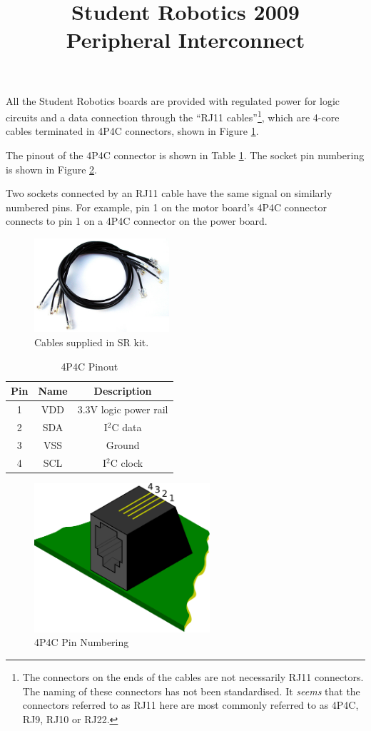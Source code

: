 \documentclass[a4paper,twocolumn]{article}
\title{Student Robotics 2009\\ Peripheral Interconnect}
\newcommand{\itwoc}{I$^2$C }
\begin{document}
\maketitle

All the Student Robotics boards are provided with regulated power for logic circuits and a data connection through the ``RJ11 cables''\footnote{The connectors on the ends of the cables are not necessarily RJ11 connectors.  The naming of these connectors has not been standardised.  It \emph{seems} that the connectors referred to as RJ11 here are most commonly referred to as 4P4C, RJ9, RJ10 or RJ22.}, which are 4-core cables terminated in 4P4C connectors, shown in Figure \ref{fig:coil}.

The pinout of the 4P4C connector is shown in Table \ref{tab:4p4c-pinout}.  The socket pin numbering is shown in Figure \ref{fig:4p4c-pin-num}.

Two sockets connected by an RJ11 cable have the same signal on similarly numbered pins.  For example, pin 1 on the motor board's 4P4C connector connects to pin 1 on a 4P4C connector on the power board.

\begin{figure}
  \begin{center}
    \includegraphics[width=5cm]{./images/coil.jpg}
  \end{center}
  \caption{\label{fig:coil}Cables supplied in SR kit.}
\end{figure}

\begin{table}
  \caption{\label{tab:4p4c-pinout}4P4C Pinout}

  \begin{center}
    \begin{tabular}{|c|c|c|}
      \hline
      \textbf{Pin} & \textbf{Name} & \textbf{Description} \\
      \hline
      1 & VDD & 3.3V logic power rail\\
      2 & SDA & \itwoc data \\
      3 & VSS & Ground \\
      4 & SCL & \itwoc clock\\
      \hline
    \end{tabular}
  \end{center}
\end{table}


\begin{figure}
  \begin{center}
    \includegraphics[width=6.5cm]{./images/4p4c.pdf}
  \end{center}
  \caption{\label{fig:4p4c-pin-num}4P4C Pin Numbering}
\end{figure}
\end{document}

